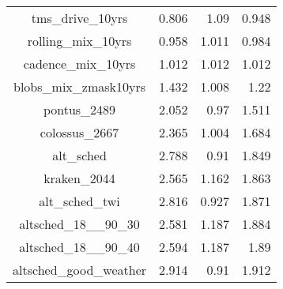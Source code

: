 \begin{table}
\begin{tabular}{crrr}
tms\_drive\_10yrs & 0.806 & 1.09 & 0.948  \\
rolling\_mix\_10yrs & 0.958 & 1.011 & 0.984  \\
cadence\_mix\_10yrs & 1.012 & 1.012 & 1.012  \\
blobs\_mix\_zmask10yrs & 1.432 & 1.008 & 1.22  \\
pontus\_2489 & 2.052 & 0.97 & 1.511  \\
colossus\_2667 & 2.365 & 1.004 & 1.684  \\
alt\_sched & 2.788 & 0.91 & 1.849  \\
kraken\_2044 & 2.565 & 1.162 & 1.863  \\
alt\_sched\_twi & 2.816 & 0.927 & 1.871  \\
altsched\_18\_\_90\_30 & 2.581 & 1.187 & 1.884  \\
altsched\_18\_\_90\_40 & 2.594 & 1.187 & 1.89  \\
altsched\_good\_weather & 2.914 & 0.91 & 1.912  \\
\hline
\end{tabular}
\end{table}

